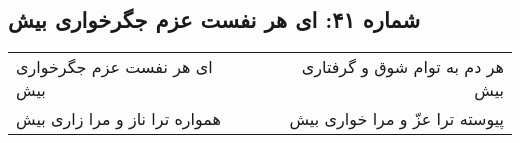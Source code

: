 \begin{center}
\section*{شماره ۴۱: ای هر نفست عزم جگرخواری بیش}
\label{sec:041}
\begin{longtable}{l p{0.5cm} r}
ای هر نفست عزم جگرخواری بیش
&&
هر دم به توام شوق و گرفتاری بیش
\\
همواره ترا ناز و مرا زاری بیش
&&
پیوسته ترا عزّ و مرا خواری بیش
\\
\end{longtable}
\end{center}
